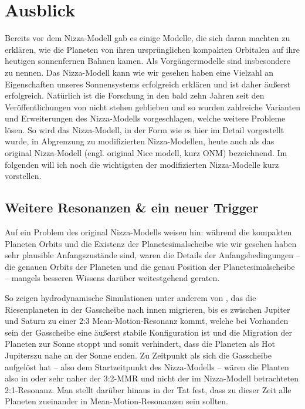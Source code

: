 \documentclass[12pt,a4paper,twoside]{article}
\begin{document}
\section{Ausblick}\label{erweiterungen}
Bereits vor dem Nizza-Modell gab es einige Modelle, die sich daran machten zu erklären, wie die Planeten von ihren ursprünglichen kompakten Orbitalen auf ihre heutigen sonnenfernen Bahnen kamen. Als Vorgängermodelle sind insbesondere \cite{Thommes1999,Thommes2003,Levison2004} zu nennen. %
Das Nizza-Modell kann wie wir gesehen haben eine Vielzahl an Eigenschaften unseres Sonnensystems erfolgreich erklären und ist daher äußerst erfolgreich.
Natürlich ist die Forschung in den bald zehn Jahren seit den Veröffentlichungen von \cite{Tsiganis2005,Morbidelli2005,Gomes2005} nicht stehen geblieben und so wurden zahlreiche Varianten und Erweiterungen des Nizza-Modells vorgeschlagen, welche weitere Probleme lösen.
So wird das Nizza-Modell, in der Form wie es hier im Detail vorgestellt wurde, in Abgrenzung zu modifizierten Nizza-Modellen, heute auch als das original Nizza-Modell (engl. \glqq original Nice modell\grqq, kurz ONM) bezeichnend.
Im folgenden will ich noch die wichtigsten der modifizierten Nizza-Modelle kurz vorstellen. %

\subsection{Weitere Resonanzen \& ein neuer Trigger}\label{Nizza2}
Auf ein Problem des original Nizza-Modells weisen \cite{Morbidelli2007a} hin: während die kompakten Planeten Orbits und die Existenz der Planetesimalscheibe wie wir gesehen haben sehr plausible Anfangszustände sind, waren die Details der Anfangsbedingungen -- die genauen Orbits der Planeten und die genau Position der Planetesimalscheibe -- mangels besseren Wissens darüber weitestgehend geraten.

So zeigen hydrodynamische Simulationen unter anderem von \cite{Morbidelli2007a}, das die Riesenplaneten in der Gasscheibe nach innen migrieren, bis es zwischen Jupiter und Saturn zu einer 2:3 Mean-Motion-Resonanz kommt, welche bei Vorhanden sein der Gasscheibe eine äußerst stabile Konfiguration ist und die Migration der Planeten zur Sonne stoppt und somit verhindert, dass die Planeten als \glqq Hot Jupiters\grqq zu nahe an der Sonne enden\cite{Morbidelli2007a}.
Zu Zeitpunkt als sich die Gasscheibe aufgelöst hat -- also dem Startzeitpunkt des Nizza-Modells -- wären die Planten also in oder sehr naher der 3:2-MMR und nicht der im Nizza-Modell betrachteten 2:1-Resonanz.
Man stellt darüber hinaus in der Tat fest, dass zu dieser Zeit alle Planeten zueinander in Mean-Motion-Resonanzen sein sollten.
\end{document}
